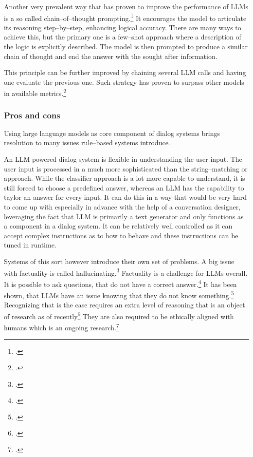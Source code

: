 \documentclass[12pt]{report}
\begin{document}
{Another very prevalent way that has proven to
improve the performance of LLMs is a so called
chain–of–thought prompting.\footcite{wei2022chain}
It encourages the model to
articulate its reasoning step–by–step,
enhancing logical accuracy.
There are many ways to achieve this,
but the primary one is a few–shot approach
where a description of the logic is
explicitly described.
The model is then prompted to produce
a similar chain of thought
and end the answer with the sought after information.

This principle can be further improved by
chaining several LLM calls and having one
evaluate the previous one.
Such strategy has proven to surpass other models
in available metrics.\footcite{wu2024comparative}

\subsubsection{Pros and cons}

Using large language models as core component
of dialog systems brings resolution to many issues
rule–based systems introduce.

An LLM powered dialog system is flexible in understanding
the user input.
The user input is processed in a much more sophisticated
than the string–matching or approach.
While the classifier approach is a lot more capable to understand,
it is still forced to choose a predefined answer, whereas
an LLM has the capability to taylor an answer for every input.
It can do this in a way that would be very hard to come up with
especially in advance with the help of a conversation designer,
leveraging the fact that LLM is primarily a text generator
and only functions as a component in a dialog system.
It can be relatively well controlled as
it can accept complex instructions as to how to behave
and these instructions can be tuned in runtime.

Systems of this sort however introduce their own set of problems.
A big issue with factuality is called hallucinating.\footcite{bruno2023insights, perkovic2024hallucinations}
Factuality is a challenge for LLMs overall.
It is possible to ask questions,
that do not have a correct answer.\footcite{payandeh2023susceptible}
It has been shown, that LLMs have an issue
knowing that they do not know something.\footcite{yin2023large}
Recognizing that is the case requires
an extra level of reasoning
that is an object of research as of recently\footcite{transformer_circuits_2024}
They are also required to be ethically aligned with humans which is an ongoing research.\footcite{wang2024comprehensive}

}
\end{document}
